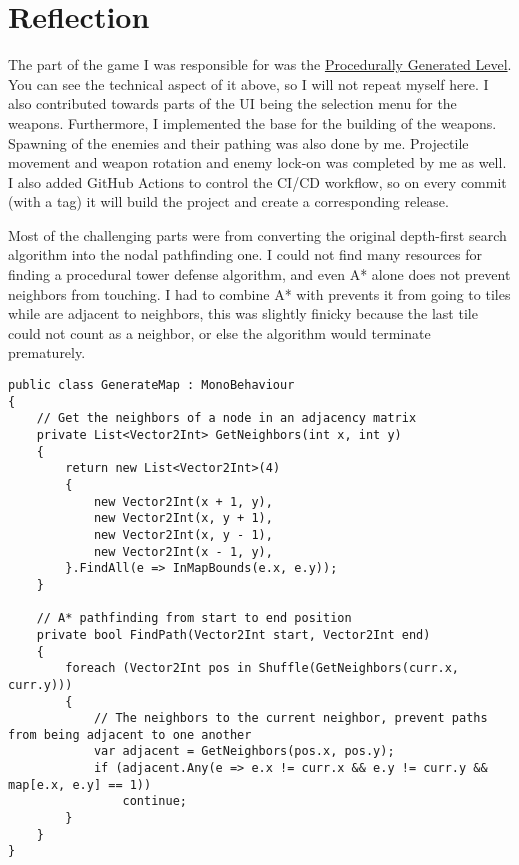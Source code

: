 \documentclass{article}
\begin{document}
\section{Reflection}
\label{sec:Reflection}


The part of the game I was responsible for was the \hyperref[sec:Requirements]{Procedurally Generated Level}. You can see the technical aspect of it above, so I will not repeat myself here. I also contributed towards parts of the UI being the selection menu for the weapons. Furthermore, I implemented the base for the building of the weapons. Spawning of the enemies and their pathing was also done by me. Projectile movement and weapon rotation and enemy lock-on was completed by me as well. I also added GitHub Actions to control the CI/CD workflow, so on every commit (with a tag) it will build the project and create a corresponding release.

Most of the challenging parts were from converting the original depth-first search algorithm into the nodal pathfinding one. I could not find many resources for finding a procedural tower defense algorithm, and even A* alone does not prevent neighbors from touching. I had to combine A* with prevents it from going to tiles while are adjacent to neighbors, this was slightly finicky because the last tile could not count as a neighbor, or else the algorithm would terminate prematurely.

\begin{lstlisting}
public class GenerateMap : MonoBehaviour
{
    // Get the neighbors of a node in an adjacency matrix
    private List<Vector2Int> GetNeighbors(int x, int y)
    {
        return new List<Vector2Int>(4)
        {
            new Vector2Int(x + 1, y),
            new Vector2Int(x, y + 1),
            new Vector2Int(x, y - 1),
            new Vector2Int(x - 1, y),
        }.FindAll(e => InMapBounds(e.x, e.y));
    }

    // A* pathfinding from start to end position
    private bool FindPath(Vector2Int start, Vector2Int end)
    {
        foreach (Vector2Int pos in Shuffle(GetNeighbors(curr.x, curr.y)))
        {
            // The neighbors to the current neighbor, prevent paths from being adjacent to one another
            var adjacent = GetNeighbors(pos.x, pos.y);
            if (adjacent.Any(e => e.x != curr.x && e.y != curr.y && map[e.x, e.y] == 1))
                continue;
        }
    }
}
\end{lstlisting}
\end{document}
